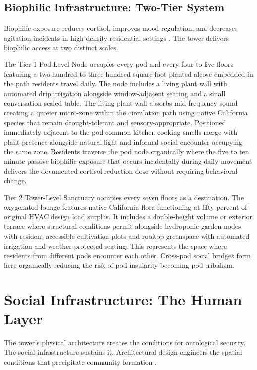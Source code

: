 \documentclass[12pt, letterpaper]{article}
\begin{document}
\subsection{Biophilic Infrastructure: Two-Tier System}

Biophilic exposure reduces cortisol, improves mood regulation, and decreases agitation incidents in high-density residential settings \citep{grand_rising_bh_2024, imeg_biophilic_2024}. The tower delivers biophilic access at two distinct scales.

The Tier 1 Pod-Level Node occupies every pod and every four to five floors featuring a two hundred to three hundred square foot planted alcove embedded in the path residents travel daily. The node includes a living plant wall with automated drip irrigation alongside window-adjacent seating and a small conversation-scaled table. The living plant wall absorbs mid-frequency sound creating a quieter micro-zone within the circulation path using native California species that remain drought-tolerant and sensory-appropriate. Positioned immediately adjacent to the pod common kitchen cooking smells merge with plant presence alongside natural light and informal social encounter occupying the same zone. Residents traverse the pod node organically where the five to ten minute passive biophilic exposure that occurs incidentally during daily movement delivers the documented cortisol-reduction dose without requiring behavioral change.

Tier 2 Tower-Level Sanctuary occupies every seven floors as a destination. The oxygenated lounge features native California flora functioning at fifty percent of original HVAC design load surplus. It includes a double-height volume or exterior terrace where structural conditions permit alongside hydroponic garden nodes with resident-accessible cultivation plots and rooftop greenspace with automated irrigation and weather-protected seating. This represents the space where residents from different pods encounter each other. Cross-pod social bridges form here organically reducing the risk of pod insularity becoming pod tribalism.

\clearpage
\section{Social Infrastructure: The Human Layer}

The tower's physical architecture creates the conditions for ontological security. The social infrastructure sustains it. Architectural design engineers the spatial conditions that precipitate community formation \citep{frontiers_acoustic_2024}.
\end{document}
